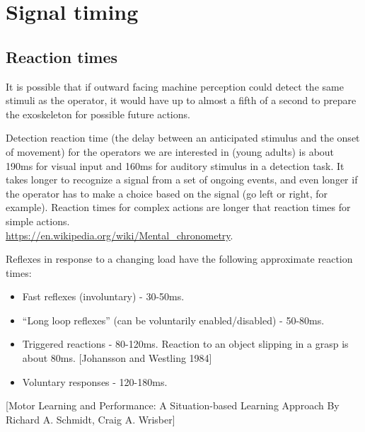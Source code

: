 \documentclass[letterpaper,12pt,fullpage]{article}
\begin{document}
\section{Signal timing}

\subsection{Reaction times}

It is possible that if outward facing machine perception could
detect the same stimuli as the operator,
it would have up to almost a fifth of a second
to prepare the exoskeleton for possible future actions.

Detection reaction time (the delay between an anticipated 
stimulus and the onset of movement) 
for the operators we are interested in (young adults)
is about
190ms for visual input and
160ms for auditory stimulus in a detection task.
It takes longer to recognize a signal from a set of ongoing events,
and even longer if the operator has to make a choice based on the signal
(go left or right, for example).
Reaction times for complex actions are longer that reaction times
for simple actions.\\
\url{https://en.wikipedia.org/wiki/Mental_chronometry}.

Reflexes in response to a changing load have the following approximate reaction times:
\begin{itemize}
\item
Fast reflexes (involuntary) - 30-50ms.
\item
``Long loop reflexes'' (can be voluntarily enabled/disabled) - 50-80ms.
\item
Triggered reactions - 80-120ms.
Reaction to an object slipping in a grasp is about 80ms.
[Johansson and Westling 1984]
\item
Voluntary responses - 120-180ms.
\end{itemize}
[Motor Learning and Performance: A Situation-based Learning Approach
 By Richard A. Schmidt, Craig A. Wrisber]
\end{document}
